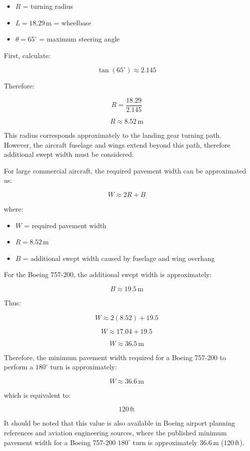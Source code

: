 \documentclass{KPS_assignment}
\begin{document}
\begin{enumerate}
\begin{itemize}
    \item \(R\) = turning radius
    \item \(L = 18.29\,\text{m}\) = wheelbase
    \item \(\theta = 65^\circ\) = maximum steering angle
\end{itemize}

First, calculate:

\[
\tan(65^\circ) \approx 2.145
\]

Therefore:

\[
R = \frac{18.29}{2.145}
\]

\[
R \approx 8.52\,\text{m}
\]

This radius corresponds approximately to the landing gear turning path. However, the aircraft fuselage and wings extend beyond this path, therefore additional swept width must be considered.

For large commercial aircraft, the required pavement width can be approximated as:

\[
W \approx 2R + B
\]

where:

\begin{itemize}
    \item \(W\) = required pavement width
    \item \(R = 8.52\,\text{m}\)
    \item \(B\) = additional swept width caused by fuselage and wing overhang
\end{itemize}

For the Boeing 757-200, the additional swept width is approximately:

\[
B \approx 19.5\,\text{m}
\]

Thus:

\[
W \approx 2(8.52) + 19.5
\]

\[
W \approx 17.04 + 19.5
\]

\[
W \approx 36.5\,\text{m}
\]

Therefore, the minimum pavement width required for a Boeing 757-200 to perform a \(180^\circ\) turn is approximately:

\[
\boxed{W \approx 36.6\,\text{m}}
\]

which is equivalent to:

\[
\boxed{120\,\text{ft}}
\]

It should be noted that this value is also available in Boeing airport planning references and aviation engineering sources, where the published minimum pavement width for a Boeing 757-200 \(180^\circ\) turn is approximately \(36.6\,\text{m}\) (\(120\,\text{ft}\)).



\end{enumerate}
\end{document}
